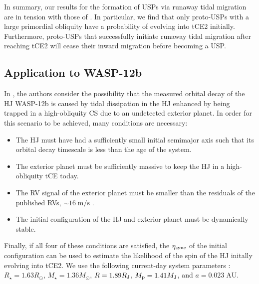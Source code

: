 \documentclass[
        fleqn,
        usenatbib,
    ]{mnras}
\begin{document}
In summary, our results for the formation of USPs via runaway tidal migration
are in tension with those of \citet{millholland2020formation}. In particular, we
find that only proto-USPs with a large primordial obliquity have a probability
of evolving into tCE2 initially. Furthermore, proto-USPs that successfully
initiate runaway tidal migration after reaching tCE2 will cease their inward
migration before becoming a USP\@.

\subsection{Application to WASP-12b}\label{ss:disc_wasp12b}

In \citet{millholland2019obliquity}, the authors consider the possibility that
the measured orbital decay of the HJ WASP-12b \citep[$P / \dot{P} = -3.2
\;\mathrm{Myr}$; ][]{maciejewski2016departure, patra2017apparently} is caused by
tidal dissipation in the HJ enhanced by being trapped in a high-obliquity CS due
to an undetected exterior planet. In order for this scenario to be achieved,
many conditions are necessary:
\begin{itemize}
    \item The HJ must have had a sufficiently small initial semimajor axis such
        that its orbital decay timescale is less than the age of the system.

    \item The exterior planet must be sufficiently massive to keep the HJ in a
        high-obliquity tCE today.

    \item The RV signal of the exterior planet must be smaller than the
        residuals of the published RVs, $\sim 16\;\mathrm{m/s}$
        \citep{hebb2009wasp, husnoo2011orbital, knutson2014friends,
        bonomo2017gaps}.

    \item The initial configuration of the HJ and exterior planet must be
        dynamically stable.
\end{itemize}
Finally, if all four of these conditions are satisfied, the $\eta_{\rm sync}$ of
the initial configuration can be used to estimate the likelihood of the spin of
the HJ initally evolving into tCE2. We use the following current-day system
parameters \citet{hebb2009wasp, maciejewski2013multi, millholland_wasp12b}:
$R_\star = 1.63R_{\odot}$, $M_\star = 1.36M_{\odot}$, $R = 1.89R_{\rm J}$,
$M_{\rm p} = 1.41M_{\rm J}$, and $a = 0.023 \;\mathrm{AU}$.
\end{document}
